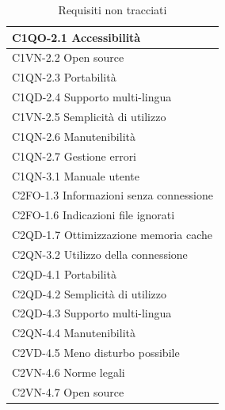 \begin{table}[!h]
\begin{footnotesize}
\begin{tabular}{|l|}
C1QO-2.1 Accessibilit\`a \\ \hline
C1VN-2.2 Open source \\ \hline
C1QN-2.3 Portabilit\`a \\ \hline
C1QD-2.4 Supporto multi-lingua \\ \hline
C1VN-2.5 Semplicit\`a di utilizzo \\ \hline
C1QN-2.6 Manutenibilit\`a \\ \hline
C1QN-2.7 Gestione errori \\ \hline
C1QN-3.1 Manuale utente \\ \hline
C2FO-1.3 Informazioni senza connessione \\ \hline
C2FO-1.6 Indicazioni file ignorati \\ \hline
C2QD-1.7 Ottimizzazione memoria cache \\ \hline 
C2QN-3.2 Utilizzo della connessione \\ \hline 
C2QD-4.1 Portabilit\`a \\ \hline
C2QD-4.2 Semplicit\`a di utilizzo \\ \hline
C2QD-4.3 Supporto multi-lingua \\ \hline
C2QN-4.4 Manutenibilit\`a \\ \hline
C2VD-4.5 Meno disturbo possibile \\ \hline
C2VN-4.6 Norme legali \\ \hline
C2VN-4.7 Open source \\ \hline
\end{tabular}
\end{footnotesize}
\caption{Requisiti non tracciati}
\end{table}


\listoftables
{}
\listoffigures
{}

